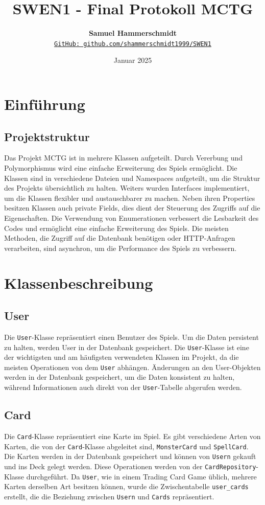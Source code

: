 \documentclass[a4paper, 12pt]{article}
\title{\vspace{-1cm}SWEN1 - Final Protokoll MCTG}
\author{
    \textbf{Samuel Hammerschmidt} \\
    \href{https://github.com/shammerschmidt1999/SWEN1}{\texttt{GitHub: github.com/shammerschmidt1999/SWEN1}}
}
\date{Januar 2025}
\begin{document}
\maketitle

\section{Einführung}
\subsection{Projektstruktur}
Das Projekt MCTG ist in mehrere Klassen aufgeteilt. Durch Vererbung und Polymorphismus wird eine einfache Erweiterung des Spiels ermöglicht.
Die Klassen sind in verschiedene Dateien und Namespaces aufgeteilt, um die Struktur des Projekts übersichtlich zu halten. 
Weiters wurden Interfaces implementiert, um die Klassen flexibler und austauschbarer zu machen.
Neben ihren Properties besitzen Klassen auch private Fields, dies dient der Steuerung des Zugriffs auf die Eigenschaften.
Die Verwendung von Enumerationen verbessert die Lesbarkeit des Codes und ermöglicht eine einfache Erweiterung des Spiels.
Die meisten Methoden, die Zugriff auf die Datenbank benötigen oder HTTP-Anfragen verarbeiten, sind asynchron, um die Performance des Spiels zu verbessern.

\vspace{0.5cm}
\section{Klassenbeschreibung}
\subsection{User}
Die \texttt{User}-Klasse repräsentiert einen Benutzer des Spiels. Um die Daten persistent zu halten, werden User in der Datenbank gespeichert.
Die \texttt{User}-Klasse ist eine der wichtigsten und am häufigsten verwendeten Klassen im Projekt, da die meisten Operationen von dem \texttt{User} abhängen.
Änderungen an den User-Objekten werden in der Datenbank gespeichert, um die Daten konsistent zu halten, während Informationen auch direkt von der \texttt{User}-Tabelle abgerufen werden.

\subsection{Card}
Die \texttt{Card}-Klasse repräsentiert eine Karte im Spiel. Es gibt verschiedene Arten von Karten, die von der \texttt{Card}-Klasse abgeleitet sind, \texttt{MonsterCard} und \texttt{SpellCard}.
Die Karten werden in der Datenbank gespeichert und können von \texttt{Usern} gekauft und ins Deck gelegt werden. Diese Operationen werden von der \texttt{CardRepository}-Klasse durchgeführt.
Da \texttt{User}, wie in einem Trading Card Game üblich, mehrere Karten derselben Art besitzen können, wurde die Zwischentabelle \texttt{user\_cards} erstellt, die die Beziehung zwischen \texttt{Usern} und \texttt{Cards} repräsentiert.
\end{document}
